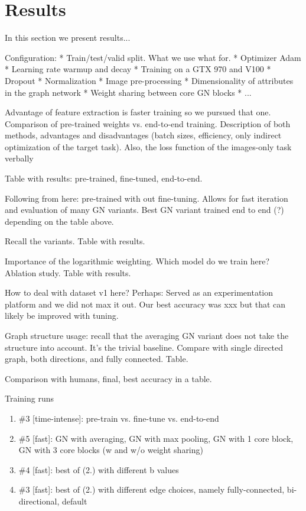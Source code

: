 \section{Results}

In this section we present results...

Configuration:
* Train/test/valid split. What we use what for.
* Optimizer Adam
* Learning rate warmup and decay
* Training on a GTX 970 and V100
* Dropout
* Normalization
* Image pre-processing
* Dimensionality of attributes in the graph network
* Weight sharing between core GN blocks
* ...

Advantage of feature extraction is faster training so we pursued that one. Comparison of pre-trained weights vs. end-to-end training. Description of both methods, advantages and disadvantages (batch sizes, efficiency, only indirect optimization of the target task). Also, the loss function of the images-only task verbally

Table with results: pre-trained, fine-tuned, end-to-end.

Following from here: pre-trained with out fine-tuning. Allows for fast iteration and evaluation of many GN variants. Best GN variant trained end to end (?) depending on the table above.

Recall the variants. Table with results.

Importance of the logarithmic weighting. Which model do we train here? Ablation study. Table with results.

How to deal with dataset v1 here? Perhaps: Served as an experimentation platform and we did not max it out. Our best accuracy was xxx but that can likely be improved with tuning.

Graph structure usage: recall that the averaging GN variant does not take the structure into account. It's the trivial baseline. Compare with single directed graph, both directions, and fully connected. Table.

Comparison with humans, final, best accuracy in a table.

Training runs
\begin{enumerate}
    \item \#3 [time-intense]: pre-train vs. fine-tune vs. end-to-end
    \item \#5 [fast]: GN with averaging, GN with max pooling, GN with 1 core block, GN with 3 core blocks (w and w/o weight sharing)
    \item \#4 [fast]: best of (2.) with different b values
    \item \#3 [fast]: best of (2.) with different edge choices, namely fully-connected, bi-directional, default
\end{enumerate}
